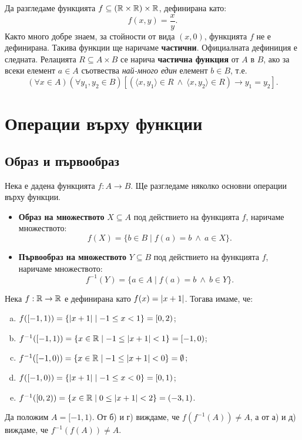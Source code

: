 Да разгледаме функцията $f \subseteq (\mathbb{R}\times\mathbb{R})\times\mathbb{R}$, дефинирана като:
\[f(x,y) = \frac{x}{y}.\]
Както много добре знаем, за стойности от вида $(x,0)$, функцията $f$ не е дефинирана.
Такива функции ще наричаме {\bf частични}.
Официалната дефиниция е следната.
Релацията $R \subseteq A\times B$ се нарича {\bf частична функция} от $A$ в $B$, ако
за всеки елемент $a\in A$ съотвества {\em най-много един} елемент $b \in B$, т.е.
\[(\forall x\in A)(\forall y_1,y_2 \in B)[(\langle{x,y_1}\rangle\in R\ \wedge\ \langle{x,y_2}\rangle\in R) \rightarrow y_1 = y_2].\]


\section{Операции върху функции}

\subsection*{Образ и първообраз}
Нека е дадена функцията $f:A\to B$.
Ще разгледаме няколко основни операции върху функции.

\begin{itemize}
\item 
  {\bf Образ на множеството} $X\subseteq A$ под действието на функцията $f$, наричаме
  множеството: \[f(X) = \{b\in B \mid f(a) = b\ \wedge\ a \in X\}.\]
\item
  {\bf Първообраз на множеството} $Y\subseteq B$ под действието на функцията $f$, наричаме
  множеството: \[f^{-1}(Y) = \{a\in A \mid f(a) = b\ \wedge\ b \in Y\}.\]
\end{itemize}


\begin{example}
  Нека $f:\mathbb{R}\to\mathbb{R}$ е дефинирана като $f(x) = \lvert{x+1}\rvert$.
  Тогава имаме, че:  
  \begin{enumerate}[a)]
  \item
    $f([-1,1)) = \{\lvert{x+1}\rvert \mid -1 \leq x < 1\} = [0, 2)$;
  \item
    $f^{-1}([-1,1)) = \{x\in\mathbb{R}\mid -1 \leq \lvert{x+1}\rvert < 1\} = [-1,0)$;
  \item
    $f^{-1}([-1,0)) = \{x \in \mathbb{R} \mid -1 \leq \lvert{x+1}\rvert < 0\} = \emptyset$;
  \item
    $f([-1,0)) = \{\lvert{x+1}\rvert \mid -1 \leq x < 0\} = [0, 1)$;
  \item
    $f^{-1}([0,2)) = \{x \in \mathbb{R} \mid 0 \leq \lvert{x+1}\rvert < 2\} = (-3, 1)$.
  \end{enumerate}
  Да положим $A = [-1,1)$. 
  От б) и г) виждаме, че $f(f^{-1}(A)) \neq A$, а от 
  а) и д) виждаме, че $f^{-1}(f(A)) \neq A$.
\end{example}

